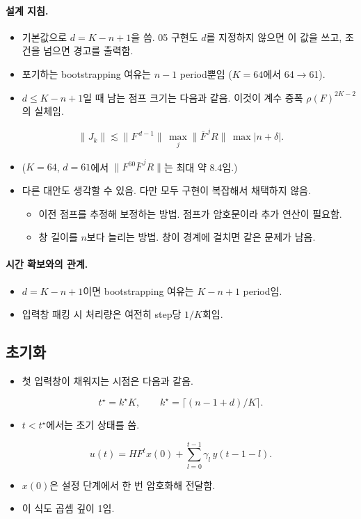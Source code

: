 \documentclass[11pt,a4paper]{article}
\newcommand{\Fb}{\bar F}
\begin{document}
\paragraph{설계 지침.}
\begin{itemize}
\item 기본값으로 $d=K-n+1$을 씀. 05 구현도 $d$를 지정하지 않으면 이 값을 쓰고, 조건을 넘으면 경고를 출력함.
\item 포기하는 bootstrapping 여유는 $n-1$ period뿐임 ($K=64$에서 64$\to$61).
\item $d\le K-n+1$일 때 남는 점프 크기는 다음과 같음. 이것이 계수 증폭 $\rho(F)^{2K-2}$의 실체임.
\end{itemize}
\begin{equation}
\|J_k\|\lesssim\|F^{\,d-1}\|\,\max_j\|\Fb^{\,j}R\|\,\max|n+\delta| .
\end{equation}
\begin{itemize}
\item[] ($K=64$, $d=61$에서 $\|F^{60}\Fb^{\,j}R\|$는 최대 약 8.4임.)
\item 다른 대안도 생각할 수 있음. 다만 모두 구현이 복잡해서 채택하지 않음.
  \begin{itemize}
  \item 이전 점프를 추정해 보정하는 방법. 점프가 암호문이라 추가 연산이 필요함.
  \item 창 길이를 $n$보다 늘리는 방법. 창이 경계에 걸치면 같은 문제가 남음.
  \end{itemize}
\end{itemize}

\paragraph{시간 확보와의 관계.}
\begin{itemize}
\item $d=K-n+1$이면 bootstrapping 여유는 $K-n+1$ period임.
\item 입력창 패킹 시 처리량은 여전히 step당 $1/K$회임.
\end{itemize}

\subsection{초기화}
\begin{itemize}
\item 첫 입력창이 채워지는 시점은 다음과 같음.
\end{itemize}
\begin{equation}
t^\star=k^\star K,\qquad k^\star=\bigl\lceil(n-1+d)/K\bigr\rceil .
\end{equation}
\begin{itemize}
\item $t<t^\star$에서는 초기 상태를 씀.
\end{itemize}
\begin{equation}
u(t)=HF^t x(0)+\sum_{l=0}^{t-1}\gamma_l\,y(t-1-l).
\label{eq:init}
\end{equation}
\begin{itemize}
\item $x(0)$은 설정 단계에서 한 번 암호화해 전달함.
\item 이 식도 곱셈 깊이 1임.
\end{itemize}
\end{document}
